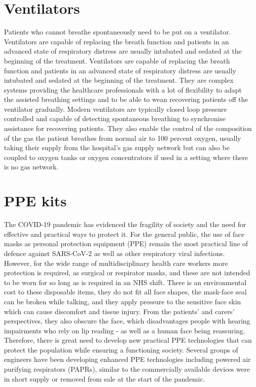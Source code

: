 \documentclass[12pt]{article}
\begin{document}
 \section{Ventilators}
 
 Patients who cannot breathe spontaneously need to be put on a ventilator. Ventilators are capable of replacing the breath function and patients in an advanced state of respiratory distress are usually intubated and sedated at the beginning of the treatment. Ventilators are capable of replacing the breath function and patients in an advanced state of respiratory distress are usually intubated and sedated at the beginning of the treatment. They are complex systems providing the healthcare professionals with a lot of flexibility to adapt the assisted breathing settings and to be able to wean recovering patients off the ventilator gradually. Modern ventilators are typically closed loop pressure controlled and capable of detecting spontaneous breathing to synchronise assistance for recovering patients. They also enable the control of the composition of the gas the patient breathes from normal air to 100 percent oxygen, usually taking their supply from the hospital’s gas supply network but can also be coupled to oxygen tanks or oxygen concentrators if used in a setting where there is no gas network.
 
 \section{PPE kits}
 
 The COVID-19 pandemic has evidenced the fragility of society and the need for effective and practical ways to protect it. For the general public, the use of face masks as personal protection equipment (PPE) remain the most practical line of defence against SARS-CoV-2 as well as other respiratory viral infections. However, for the wide range of multidisciplinary health care workers more protection is required, as surgical or respirator masks, and these are not intended to be worn for so long as is required in an NHS shift. There is an environmental cost to these disposable items, they do not fit all face shapes, the mask-face seal can be broken while talking, and they apply pressure to the sensitive face skin which can cause discomfort and tissue injury. From the patients' and carers' perspectives, they also obscure the face, which disadvantages people with hearing impairments who rely on lip reading - as well as a human face being reassuring. Therefore, there is great need to develop new practical PPE technologies that can protect the population while ensuring a functioning society.  Several groups of engineers have been developing enhanced PPE technologies including powered air purifying respirators (PAPRs), similar to the commercially available devices were in short supply or removed from sale at the start of the pandemic.
 
\end{document}
